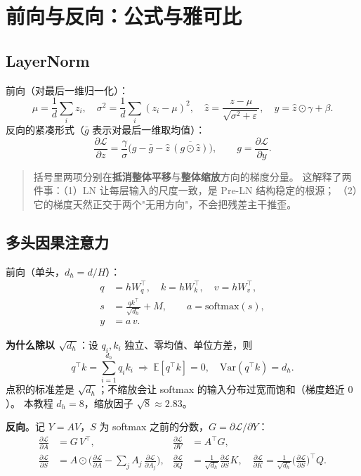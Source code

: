 \chapter{前向与反向：公式与雅可比}
\section{LayerNorm}

前向（对最后一维归一化）：
\begin{equation}
  \mu=\frac1d\sum_i z_i,\quad \sigma^2=\frac1d\sum_i(z_i-\mu)^2,\quad
  \hat z=\frac{z-\mu}{\sqrt{\sigma^2+\varepsilon}},\quad y=\hat z\odot\gamma+\beta .
\end{equation}
反向的紧凑形式（$\bar g$ 表示对最后一维取均值）：
\begin{equation}
  \frac{\partial\mathcal{L}}{\partial z}
  =\frac{\gamma}{\sigma}\Big(g-\bar g-\hat z\,\overline{(g\odot\hat z)}\Big),
  \qquad g=\frac{\partial\mathcal{L}}{\partial y}.
  \label{eq:lnback}
\end{equation}

\begin{quote}
括号里两项分别在\textbf{抵消整体平移}与\textbf{整体缩放}方向的梯度分量。
这解释了两件事：（1）LN 让每层输入的尺度一致，是 Pre-LN 结构稳定的根源；
（2）它的梯度天然正交于两个"无用方向"，不会把残差主干推歪。
\end{quote}

\section{多头因果注意力}

前向（单头，$d_h=d/H$）：
\begin{align}
  q&=hW_q^\top,\quad k=hW_k^\top,\quad v=hW_v^\top,\\
  s&=\frac{qk^\top}{\sqrt{d_h}}+M,\qquad a=\mathrm{softmax}(s),\\
  y&=a\,v .
\end{align}

\textbf{为什么除以 $\sqrt{d_h}$}：设 $q_i,k_i$ 独立、零均值、单位方差，则
\begin{equation}
  q^\top k=\sum_{i=1}^{d_h}q_ik_i\ \Rightarrow\
  \mathbb{E}[q^\top k]=0,\quad \mathrm{Var}(q^\top k)=d_h .
\end{equation}
点积的标准差是 $\sqrt{d_h}$；不缩放会让 softmax 的输入分布过宽而饱和（梯度趋近 $0$）。
本教程 $d_h=8$，缩放因子 $\sqrt8\approx2.83$。

\textbf{反向}。记 $Y=AV$，$S$ 为 softmax 之前的分数，$G=\partial\mathcal{L}/\partial Y$：
\begin{align}
  \frac{\partial\mathcal{L}}{\partial A}&=G\,V^\top, &
  \frac{\partial\mathcal{L}}{\partial V}&=A^\top G,\\
  \frac{\partial\mathcal{L}}{\partial S}&=A\odot\Big(\frac{\partial\mathcal{L}}{\partial A}
   -\sum_j A_{j}\,\frac{\partial\mathcal{L}}{\partial A_{j}}\Big), &
  \frac{\partial\mathcal{L}}{\partial Q}&=\frac{1}{\sqrt{d_h}}\frac{\partial\mathcal{L}}{\partial S}K,\quad
  \frac{\partial\mathcal{L}}{\partial K}=\frac{1}{\sqrt{d_h}}\Big(\frac{\partial\mathcal{L}}{\partial S}\Big)^\top Q .
\end{align}

